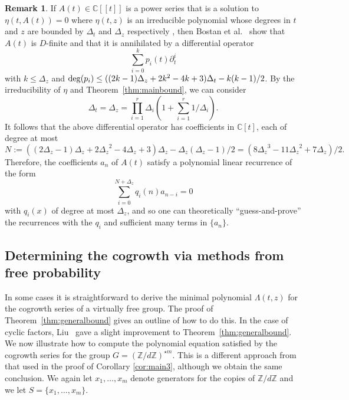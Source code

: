 \documentclass[11pt]{amsart}
\theoremstyle{definition}
\newtheorem{remark}[theorem]{Remark}
\newcommand{\C}{\mathbb{C}}
\begin{document}
\begin{remark} If $A(t)\in \mathbb{C}[[t]]$ is a power series that is a solution to $\eta(t,A(t))=0$ where $\eta(t,z)$ is an irreducible polynomial whose degrees in $t$ and $z$ are bounded by $\Delta_t$ and $\Delta_z$ respectively%
, then Bostan et al.~\cite{bostandeaf} show that $A(t)$ is $D$-finite and that it is annihilated by a differential operator $$\sum_{i=0}^k p_i(t) \partial_t^i$$ with $k\le \Delta_z$ and ${\rm deg}(p_i) \le ((2k-1)\Delta_z +2k^2 -4k+3)\Delta_t -k(k-1)/2$.
By the irreducibility of $\eta$ and Theorem~\ref{thm:mainbound}, we can consider 
$$\Delta_t=\Delta_z=\prod_{i=1}^r \Delta_i \left( 1 + \sum_{i=1}^r 1/\Delta_i \right).$$ 
It follows that the above differential operator has coefficients in $\C[t]$, each of degree at most
$$N:=((2{\Delta_z}-1){\Delta_z} + 2{\Delta_z}^2 -4{\Delta_z}+3){\Delta_z} - {\Delta_z}({\Delta_z}-1)/2 = (8{\Delta_z}^3 - 11{\Delta_z}^2+7{\Delta_z})/2.$$
Therefore, the coefficients $a_n$ of $A(t)$ satisfy a polynomial linear recurrence of the form
$$\sum_{i=0}^{N+{\Delta_z}} q_i(n) a_{n-i} = 0$$ with $q_i(x)$ of degree at most ${\Delta_z}$, and so one can theoretically ``guess-and-prove'' the recurrences with the $q_i$ and sufficient many terms in $\{a_n\}$.  
\end{remark}


\subsection{Determining the cogrowth via methods from free probability}
\label{sec:AlgSys}
In some cases it is straightforward to derive the minimal polynomial
$\Lambda(t,z)$ for the cogrowth series of a virtually free group. The proof of Theorem~\ref{thm:generalbound} gives an
outline of how to do this. In the case of cyclic factors, Liu~\cite{liu} gave a slight improvement to Theorem~\ref{thm:generalbound}. We now illustrate how to compute the
polynomial equation satisfied by the cogrowth series for the group $G=(\mathbb{Z}/d\mathbb{Z})^{\star m}$. This is a different
  approach from that used in the proof of Corollary \ref{cor:main3}, although we obtain the same conclusion. We again let $x_1,\ldots ,x_m$ denote generators for the copies of $\mathbb{Z}/d\mathbb{Z}$ and we let $S=\{x_1,\ldots ,x_m\}$.  
\end{document}
